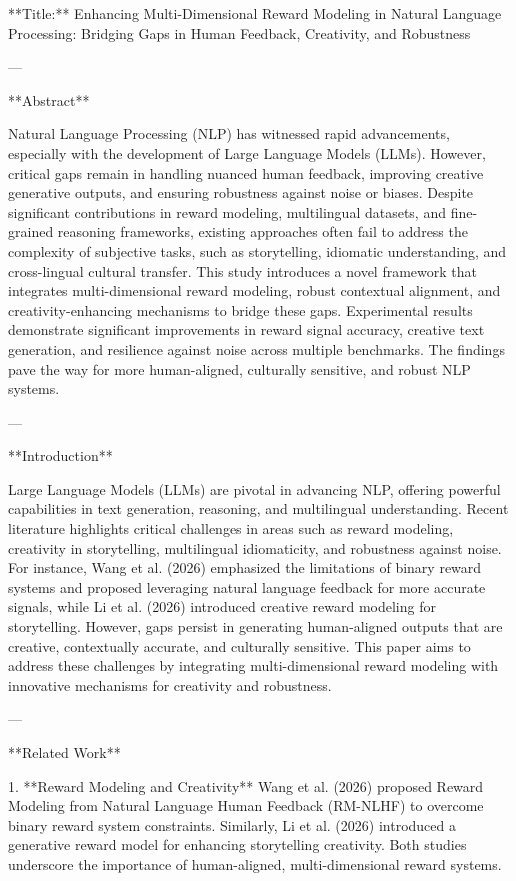 **Title:** Enhancing Multi-Dimensional Reward Modeling in Natural Language Processing: Bridging Gaps in Human Feedback, Creativity, and Robustness

---

**Abstract**

Natural Language Processing (NLP) has witnessed rapid advancements, especially with the development of Large Language Models (LLMs). However, critical gaps remain in handling nuanced human feedback, improving creative generative outputs, and ensuring robustness against noise or biases. Despite significant contributions in reward modeling, multilingual datasets, and fine-grained reasoning frameworks, existing approaches often fail to address the complexity of subjective tasks, such as storytelling, idiomatic understanding, and cross-lingual cultural transfer. This study introduces a novel framework that integrates multi-dimensional reward modeling, robust contextual alignment, and creativity-enhancing mechanisms to bridge these gaps. Experimental results demonstrate significant improvements in reward signal accuracy, creative text generation, and resilience against noise across multiple benchmarks. The findings pave the way for more human-aligned, culturally sensitive, and robust NLP systems.

---

**Introduction**

Large Language Models (LLMs) are pivotal in advancing NLP, offering powerful capabilities in text generation, reasoning, and multilingual understanding. Recent literature highlights critical challenges in areas such as reward modeling, creativity in storytelling, multilingual idiomaticity, and robustness against noise. For instance, Wang et al. (2026) emphasized the limitations of binary reward systems and proposed leveraging natural language feedback for more accurate signals, while Li et al. (2026) introduced creative reward modeling for storytelling. However, gaps persist in generating human-aligned outputs that are creative, contextually accurate, and culturally sensitive. This paper aims to address these challenges by integrating multi-dimensional reward modeling with innovative mechanisms for creativity and robustness.

---

**Related Work**

1. **Reward Modeling and Creativity**  
   Wang et al. (2026) proposed Reward Modeling from Natural Language Human Feedback (RM-NLHF) to overcome binary reward system constraints. Similarly, Li et al. (2026) introduced a generative reward model for enhancing storytelling creativity. Both studies underscore the importance of human-aligned, multi-dimensional reward systems.

